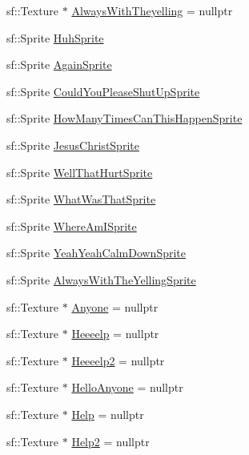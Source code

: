 \begin{DoxyCompactItemize}
\item 
sf\+::\+Texture $\ast$ \hyperlink{classDialogue_a7744310841a2275354c458d8ec32463d}{Always\+With\+Theyelling} = nullptr
\item 
sf\+::\+Sprite \hyperlink{classDialogue_ae6af9a5ea9b38c71cf31cfef5c213e39}{Huh\+Sprite}
\item 
sf\+::\+Sprite \hyperlink{classDialogue_a98acbbe8f76ed3562e37481558913d21}{Again\+Sprite}
\item 
sf\+::\+Sprite \hyperlink{classDialogue_afb2613f4ba14a82702345cbdcd6dcb95}{Could\+You\+Please\+Shut\+Up\+Sprite}
\item 
sf\+::\+Sprite \hyperlink{classDialogue_a1a895aadcac2ff23681623c889b7f131}{How\+Many\+Times\+Can\+This\+Happen\+Sprite}
\item 
sf\+::\+Sprite \hyperlink{classDialogue_a878b13ffe10617ab228e8630c53dcdca}{Jesus\+Christ\+Sprite}
\item 
sf\+::\+Sprite \hyperlink{classDialogue_acc128d221d432f840e2087c89b4e2b7b}{Well\+That\+Hurt\+Sprite}
\item 
sf\+::\+Sprite \hyperlink{classDialogue_af40f2d0d2dfded21a8a5a5b62d347fb7}{What\+Was\+That\+Sprite}
\item 
sf\+::\+Sprite \hyperlink{classDialogue_a1f385137c38c6adee1eef6f32f4abefd}{Where\+Am\+I\+Sprite}
\item 
sf\+::\+Sprite \hyperlink{classDialogue_ad95300bae2b0ffbd0f104c1450a47f10}{Yeah\+Yeah\+Calm\+Down\+Sprite}
\item 
sf\+::\+Sprite \hyperlink{classDialogue_a1eea5e12afbaad687a4eb3b17ddf1b3e}{Always\+With\+The\+Yelling\+Sprite}
\item 
sf\+::\+Texture $\ast$ \hyperlink{classDialogue_a003a8b11f40072e6146c86c0bb68b83d}{Anyone} = nullptr
\item 
sf\+::\+Texture $\ast$ \hyperlink{classDialogue_ae8a4d4f7a0a774ff022d6c81462befdf}{Heeeelp} = nullptr
\item 
sf\+::\+Texture $\ast$ \hyperlink{classDialogue_a8811756244b8c9381b7cff4f42cf366e}{Heeeelp2} = nullptr
\item 
sf\+::\+Texture $\ast$ \hyperlink{classDialogue_a051f743479e3808099f49ee71498d8f1}{Hello\+Anyone} = nullptr
\item 
sf\+::\+Texture $\ast$ \hyperlink{classDialogue_a8b2703485db5802970e8acb6c9e83ef1}{Help} = nullptr
\item 
sf\+::\+Texture $\ast$ \hyperlink{classDialogue_ade9692a24d728546bf23f015388bf21a}{Help2} = nullptr
\item 

\end{DoxyCompactItemize}
